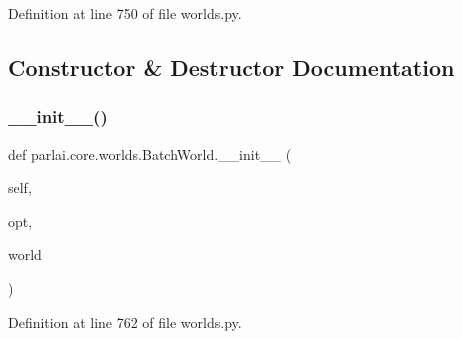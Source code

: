 Definition at line 750 of file worlds.\+py.



\subsection{Constructor \& Destructor Documentation}
\mbox{\label{classparlai_1_1core_1_1worlds_1_1BatchWorld_ac479dd6a5843a2fcf30d8acc1accc6a6}} 
\subsubsection{\texorpdfstring{\+\_\+\+\_\+init\+\_\+\+\_\+()}{\_\_init\_\_()}}
{\footnotesize\ttfamily def parlai.\+core.\+worlds.\+Batch\+World.\+\_\+\+\_\+init\+\_\+\+\_\+ (\begin{DoxyParamCaption}\item[{}]{self,  }\item[{}]{opt,  }\item[{}]{world }\end{DoxyParamCaption})}



Definition at line 762 of file worlds.\+py.



